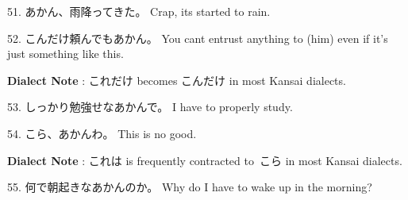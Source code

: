 \par{51. あかん、雨降ってきた。 \hfill\break
Crap, it\textquotesingle s started to rain. }

\par{52. こんだけ頼んでもあかん。 \hfill\break
You can\textquotesingle t entrust anything to (him) even if it's just something like this. }

\par{\textbf{Dialect Note }: これだけ becomes こんだけ in most Kansai dialects. }

\par{53. しっかり勉強せなあかんで。 \hfill\break
I have to properly study. }

\par{54. こら、あかんわ。 \hfill\break
This is no good. }

\par{\textbf{Dialect Note }: これは is frequently contracted to こら in most Kansai dialects. }

\par{ 55. 何で朝起きなあかんのか。 \hfill\break
Why do I have to wake up in the morning? }
    